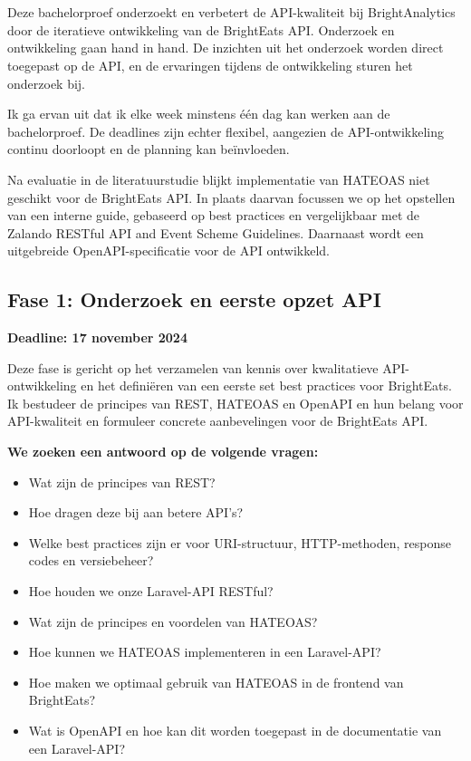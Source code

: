
\chapter{}%
\label{ch:methodologie}

Deze bachelorproef onderzoekt en verbetert de API-kwaliteit bij Bright\-Analytics door de iteratieve ontwikkeling van de Bright\-Eats API. Onderzoek en ontwikkeling gaan hand in hand. De inzichten uit het onderzoek worden direct toegepast op de API, en de ervaringen tijdens de ontwikkeling sturen het onderzoek bij.

Ik ga ervan uit dat ik elke week minstens \'e\'en dag kan werken aan de bachelorproef. De deadlines zijn echter flexibel, aangezien de API-ontwikkeling continu doorloopt en de planning kan be\"invloeden.

Na evaluatie in de literatuurstudie blijkt implementatie van HATEOAS niet geschikt voor de Bright\-Eats API. In plaats daarvan focussen we op het opstellen van een interne guide, gebaseerd op best practices en vergelijkbaar met de Zalando RESTful API and Event Scheme Guidelines. Daarnaast wordt een uitgebreide OpenAPI-specificatie voor de API ontwikkeld.

\section{Fase 1: Onderzoek en eerste opzet API}

\textbf{Deadline: 17 november 2024}

Deze fase is gericht op het verzamelen van kennis over kwalitatieve API-ontwikkeling en het defini\"eren van een eerste set best practices voor Bright\-Eats. Ik bestudeer de principes van REST, HATEOAS en OpenAPI en hun belang voor API-kwaliteit en formuleer concrete aanbevelingen voor de Bright\-Eats API.

\bigskip

\textbf{We zoeken een antwoord op de volgende vragen:}
\begin{itemize}
  \item Wat zijn de principes van REST?
  \item Hoe dragen deze bij aan betere API's?
  \item Welke best practices zijn er voor URI-structuur, HTTP-methoden, response codes en versiebeheer?
  \item Hoe houden we onze Laravel-API RESTful?
  \item Wat zijn de principes en voordelen van HATEOAS?
  \item Hoe kunnen we HATEOAS implementeren in een Laravel-API?
  \item Hoe maken we optimaal gebruik van HATEOAS in de frontend van Bright\-Eats?
  \item Wat is OpenAPI en hoe kan dit worden toegepast in de documentatie van een Laravel-API?
\end{itemize}

